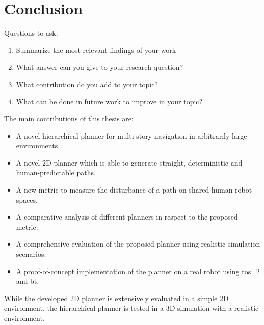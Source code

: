 \chapter{Conclusion}
\label{sec:conclusion}
Questions to ask:
\begin{enumerate}
    \item Summarize the most relevant findings of your work
    \item What answer can you give to your research question?
    \item What contribution do you add to your topic?
    \item What can be done in future work to improve in your topic?
\end{enumerate}


The main contributions of this thesis are:
\begin{itemize}
    \item A novel hierarchical planner for multi-story navigation in arbitrarily large environments
    \item A novel 2D planner which is able to generate straight, deterministic and human-predictable paths.
    \item A new metric to measure the disturbance of a path on shared human-robot spaces.
    \item A comparative analysis of different planners in respect to the proposed metric.
    \item A comprehensive evaluation of the proposed planner using realistic simulation scenarios.
    \item A proof-of-concept implementation of the planner on a real robot using \gls{ros_2} and \gls{bt}.
\end{itemize}

While the developed 2D planner is extensively evaluated in a simple 2D environment, the hierarchical planner is tested in a 3D simulation with a realistic environment.
